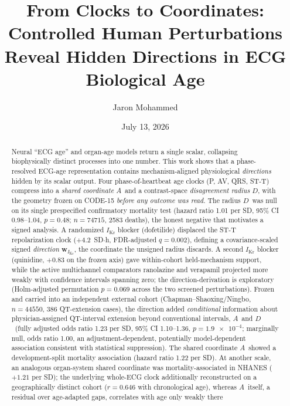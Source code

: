 \documentclass[11pt]{article}
\title{\textbf{From Clocks to Coordinates: Controlled Human Perturbations Reveal
Hidden Directions in ECG Biological Age}}
\author{Jaron Mohammed}
\date{July 13, 2026}
\newcommand{\D}{\ensuremath{D}}
\newcommand{\A}{\ensuremath{A}}
\begin{document}
\maketitle

\begin{abstract}
\noindent
Neural ``ECG age'' and organ-age models return a single scalar, collapsing biophysically
distinct processes into one number. This work shows that a phase-resolved ECG-age
representation contains mechanism-aligned physiological \emph{directions} hidden by its
scalar output. Four phase-of-heartbeat age clocks (P, AV, QRS, ST-T)
compress into a \emph{shared coordinate} \A\ and a contrast-space
\emph{disagreement radius} \D, with the
geometry frozen on CODE-15 \emph{before any outcome was read}. The radius \D\ was null on its
single prespecified confirmatory mortality test (hazard ratio \num{1.01} per SD, 95\% CI
\numrange{0.98}{1.04}, $p=\num{0.48}$; $n=\num{74715}$, \num{2583} deaths), the honest negative
that motivates a signed analysis. A randomized $I_{\text{Kr}}$ blocker (dofetilide) displaced the
ST-T repolarization clock ($+\num{4.2}$~SD$\cdot$h, FDR-adjusted $q=\num{0.002}$),
defining a covariance-scaled signed \emph{direction} $\mathbf{w}_{I_{\text{Kr}}}$, the coordinate
the unsigned radius discards. A second $I_{\text{Kr}}$ blocker (quinidine, $+\num{0.83}$ on the frozen axis) gave
within-cohort held-mechanism support, while the active multichannel comparators
ranolazine and verapamil projected more weakly with confidence intervals spanning zero;
the direction-derivation is exploratory (Holm-adjusted permutation $p=\num{0.069}$ across
the two screened perturbations). Frozen and
carried into an independent external cohort (Chapman--Shaoxing/Ningbo, $n=\num{44550}$, \num{386}
QT-extension cases), the direction added \emph{conditional} information about physician-assigned
QT-interval extension beyond conventional intervals, \A\ and \D\ (fully adjusted odds ratio
\num{1.23} per SD, 95\% CI \numrange{1.10}{1.36}, $p=\num{1.9e-4}$; marginally null, odds ratio
\num{1.00}, an adjustment-dependent, potentially model-dependent association consistent with
statistical suppression). The shared coordinate \A\ showed a development-split
mortality association (hazard ratio \num{1.22} per SD). At another scale, an
analogous organ-system shared coordinate was mortality-associated in NHANES
($+\num{1.21}$ per SD); the underlying whole-ECG clock additionally
reconstructed on a geographically distinct cohort ($r=\num{0.646}$ with chronological age),
whereas \A\ itself, a residual over age-adapted gaps, correlates with age only weakly there

\end{abstract}
\end{document}
